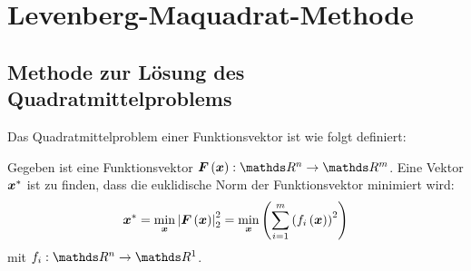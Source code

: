\ifpdf
\graphicspath{{bild/}}
\else
\graphicspath{%
	{bild/}}
\fi


\chapter{Levenberg-Maquadrat-Methode}
\label{Levenberg-Maquadrat-Methode}


\section{Methode zur Lösung des Quadratmittelproblems}
\label{Methode-zur-Lösung-des-Quadratmittelproblems}
Das Quadratmittelproblem einer Funktionsvektor ist wie folgt definiert\cite{knorrenschild2017numerische}:
\begin{definition}[Quadratmittelproblem]
Gegeben ist eine Funktionsvektor ${\vect{F\left (\vect{x}\right )}}: \Reals^{n}\to \Reals^{m}$. Eine Vektor ${\boldsymbol x^{\ast}}$ ist zu finden, dass die euklidische Norm der Funktionsvektor minimiert wird:
\begin{eqnarray}
{\boldsymbol x^{\ast}} = \mathop {\min }\limits_{\boldsymbol x}\left | {\boldsymbol F}\left ( {\boldsymbol x} \right ) \right |_{2}^{2} = \mathop {\min }\limits_{\boldsymbol x}\left ( \sum_{i=1}^{m}\left ( f_{i}\left ( \boldsymbol x \right ) \right )^{2}\right )
\label{Def_LSP}\notag\\
\end{eqnarray}
mit $f_{i}: \Reals^{n}\to \Reals^{1}$.
\end{definition}
